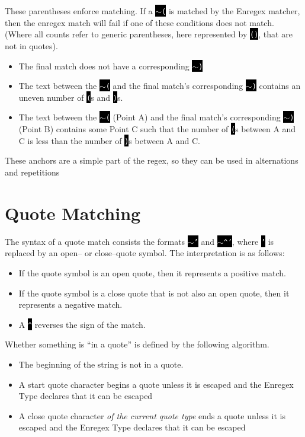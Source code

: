 \documentclass{book}
\newcommand{\code}{\texttt}
\newcommand{\codebox}[1]{\leavevmode\colorbox{black}{\textcolor{white}{\code{#1}}}}
\newcommand{\til}{$\sim$}
\begin{document}
These parentheses enforce matching. If a \codebox{\til(} is matched by the Enregex matcher, then the enregex match will fail if one of these conditions does not match. (Where all counts refer to generic parentheses, here represented by \codebox{()}, that are not in quotes).

\begin{itemize}
\item The final match does not have a corresponding \codebox{\til)}
\item The text between the \codebox{\til(} and the final match's corresponding \codebox{\til)} contains an uneven number of \codebox{(}s and \codebox{)}s.
\item The text between the \codebox{\til(} (Point A) and the final match's corresponding \codebox{\til)} (Point B) contains some Point C such that the number of \codebox{(}s between A and C is less than the number of \codebox{)}s between A and C.
\end{itemize}

These anchors are a simple part of the regex, so they can be used in alternations and repetitions

\section{Quote Matching}
The syntax of a quote match consists the formats \codebox{\til'} and \codebox{\til\^{}'}, where \codebox{'} is replaced by an open-- or close--quote symbol. The interpretation is as follows:

\begin{itemize}
\item If the quote symbol is an open quote, then it represents a positive match.
\item If the quote symbol is a close quote that is not also an open quote, then it represents a negative match.
\item A \codebox{\^{}} reverses the sign of the match.
\end{itemize}

Whether something is ``in a quote'' is defined by the following algorithm.

\begin{itemize}
\item The beginning of the string is not in a quote.
\item A start quote character begins a quote unless it is escaped and the Enregex Type declares that it can be escaped
\item A close quote character \emph{of the current quote type} ends a quote unless it is escaped and the Enregex Type declares that it can be escaped
\end{itemize}
\end{document}
